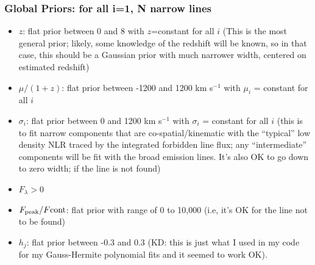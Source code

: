 \documentclass[12pt,letterpaper]{article}
\begin{document}
\subsubsection*{Global Priors: for all i=1, N narrow lines}
\begin{itemize}

  \item $z$: flat prior between 0 and 8 with $z$=constant for all $i$ (This is the most general prior; likely, some knowledge of the redshift will be known, so in that case, this should be a Gaussian prior with much narrower width, centered on estimated redshift)
  \item $\mu/(1+z)$: flat prior between -1200 and 1200 km s$^{-1}$ with $\mu_i$ = constant for all $i$
  \item $\sigma_i$: flat prior between 0 and 1200 km s$^{-1}$ with $\sigma_i$ = constant for all $i$ {\it} (this is to fit narrow components that are co-spatial/kinematic with the ``typical'' low density NLR traced by the integrated forbidden line flux; any ``intermediate'' components will be fit with the broad emission lines.  It's also OK to go down to zero width; if the line is not found)
 \item $F_{\lambda} > 0$
 \item $F_{\rm peak}/F{\rm cont}$: flat prior with range of 0 to 10,000 (i.e, it's OK for the line not to be found)
 \item $h_j$: flat prior between -0.3 and 0.3 (KD: this is just what I used in my code for my Gauss-Hermite polynomial fits and it seemed to work OK).

\end{itemize}
\end{document}

